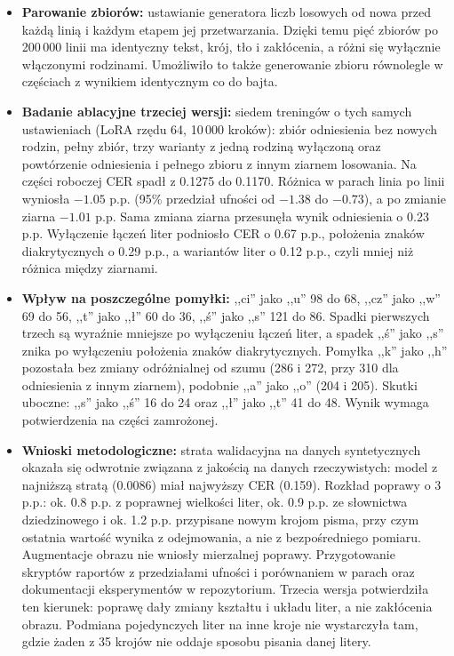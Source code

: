 \begin{itemize}
	\item \textbf{Parowanie zbiorów:} ustawianie generatora liczb losowych
	od nowa przed każdą linią i każdym etapem jej przetwarzania. Dzięki temu
	pięć zbiorów po 200\,000 linii ma identyczny tekst, krój, tło
	i zakłócenia, a różni się wyłącznie włączonymi rodzinami. Umożliwiło to
	także generowanie zbioru równolegle w częściach z wynikiem identycznym
	co do bajta.

	\item \textbf{Badanie ablacyjne trzeciej wersji:} siedem treningów
	o tych samych ustawieniach (LoRA rzędu 64, 10\,000 kroków): zbiór
	odniesienia bez nowych rodzin, pełny zbiór, trzy warianty z jedną rodziną
	wyłączoną oraz powtórzenie odniesienia i pełnego zbioru z innym ziarnem
	losowania. Na części roboczej CER spadł z 0.1275 do 0.1170. Różnica
	w parach linia po linii wyniosła $-1.05$ p.p. (95\% przedział ufności
	od $-1.38$ do $-0.73$), a po zmianie ziarna $-1.01$ p.p. Sama zmiana
	ziarna przesunęła wynik odniesienia o 0.23 p.p. Wyłączenie łączeń liter
	podniosło CER o 0.67 p.p., położenia znaków diakrytycznych o 0.29 p.p.,
	a wariantów liter o 0.12 p.p., czyli mniej niż różnica między ziarnami.

	\item \textbf{Wpływ na poszczególne pomyłki:} ,,ci'' jako ,,u'' 98 do 68,
	,,cz'' jako ,,w'' 69 do 56, ,,t'' jako ,,ł'' 60 do 36, ,,ś'' jako ,,s''
	121 do 86. Spadki pierwszych trzech są wyraźnie mniejsze po wyłączeniu
	łączeń liter, a spadek ,,ś'' jako ,,s'' znika po wyłączeniu położenia
	znaków diakrytycznych. Pomyłka ,,k'' jako ,,h'' pozostała bez zmiany
	odróżnialnej od szumu (286 i 272, przy 310 dla odniesienia z innym
	ziarnem), podobnie ,,a'' jako ,,o'' (204 i 205). Skutki uboczne:
	,,s'' jako ,,ś'' 16 do 24 oraz ,,ł'' jako ,,t'' 41 do 48. Wynik wymaga
	potwierdzenia na części zamrożonej.

	\item \textbf{Wnioski metodologiczne:} strata walidacyjna na danych
	syntetycznych okazała się odwrotnie związana z jakością na danych
	rzeczywistych: model z najniższą stratą (0.0086) miał najwyższy CER
	(0.159). Rozkład poprawy o 3 p.p.: ok. 0.8 p.p. z poprawnej wielkości
	liter, ok. 0.9 p.p. ze słownictwa dziedzinowego i ok. 1.2 p.p.
	przypisane nowym krojom pisma, przy czym ostatnia wartość wynika
	z odejmowania, a nie z bezpośredniego pomiaru. Augmentacje obrazu
	nie wniosły mierzalnej poprawy. Przygotowanie skryptów raportów
	z przedziałami ufności i porównaniem w parach oraz dokumentacji
	eksperymentów w repozytorium. Trzecia wersja potwierdziła ten kierunek:
	poprawę dały zmiany kształtu i układu liter, a nie zakłócenia obrazu.
	Podmiana pojedynczych liter na inne kroje nie wystarczyła tam, gdzie
	żaden z 35 krojów nie oddaje sposobu pisania danej litery.
\end{itemize}

